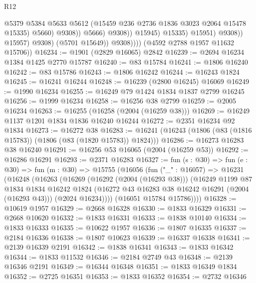 \begin{lexlean}{R12}
\begin{coremodule}
                                          @5379
                                          @5384
                                          @5633
                                          @5612
                                          (@15459 @236 @2736 @1836 @3023 @2064 @15478 @15335)
                                          @5660)
                                        @9308))
                                    @5666)
                                  @9308))
                              @15945)
                            @15335)
                          @15951)
                        @9308))
                    @15957)
                  @9308)
                (@5701 @15649))
              @9308))))
      (@4592 @2788 @1957 @11632 @15706))
@16234 := @1901 (@2829 @16065) @2842
@16239 := @2694 @16234 @1384 @1425 @2770 @15787
@16240 := @83 @15784
@16241 := @1806 @16240
@16242 := @83 @15786
@16243 := @1806 @16242
@16244 := @16243 @1824
@16245 := @16241 @16244
@16248 := @16239 (@2800 @16245) @16069
@16249 := @1990 @16234
@16255 := @16249 @79 @1424 @1834 @1837 @2799 @16245
@16256 := @1999 @16234
@16258 := @16256 @38 @2799
@16259 := @2005 @16234
@16263 := @16255 (@16258 (@2004 (@16259 @38)))
@16269 := @16249 @1137 @1201 @1834 @1836 @16240 @16244
@16272 := @2351 @16234 @92 @1834
@16273 := @16272 @38
@16283 := @16241 (@16243 (@1806 (@83 (@1816 @15783)) (@1806 (@83 (@1820 @15783)) @1824)))
@16286 := @16273 @16283 @38 @16240
@16291 := @16256 @53 @16065 (@2004 (@16259 @53))
@16292 := @16286 @16291
@16293 := @2371 @16283
@16327 := fun (s : @30) =>
  fun (e : @30) =>
  fun (m : @30) =>
  @15755
    (@16056
      (fun ("_" : @16057) =>
      @16231
        (@16248
          (@16263
            (@16269
              (@16292 (@2004 (@16293 @38)))
              (@16249
                @1199
                @87
                @1834
                @1834
                @16242
                @1824
                (@16272 @43 @16283 @38 @16242 @16291 (@2004 (@16293 @43)))
                (@2024 @16234))))
          (@16051 @15784 @15786))))
@16328 := @10619 @1957
@16329 := @2668 @16328
@16330 := @1833 @16329
@16331 := @2668 @10620
@16332 := @1833 @16331
@16333 := @1838 @10140
@16334 := @1833 @16333
@16335 := @10622 @1957
@16336 := @1807 @16335
@16337 := @2184 @16336
@16338 := @1807 @10623
@16339 := @16337 @16338
@16341 := @2139 @16339 @2191
@16342 := @1838 @16341
@16343 := @1833 @16342
@16344 := @1833 @11532
@16346 := @2184 @2749 @43
@16348 := @2139 @16346 @2191
@16349 := @16344 @16348
@16351 := @1833 @16349 @1834
@16352 := @2725 @16351
@16353 := @1833 @16352
@16354 := @2732 @16346

\end{coremodule}
\end{lexlean}
